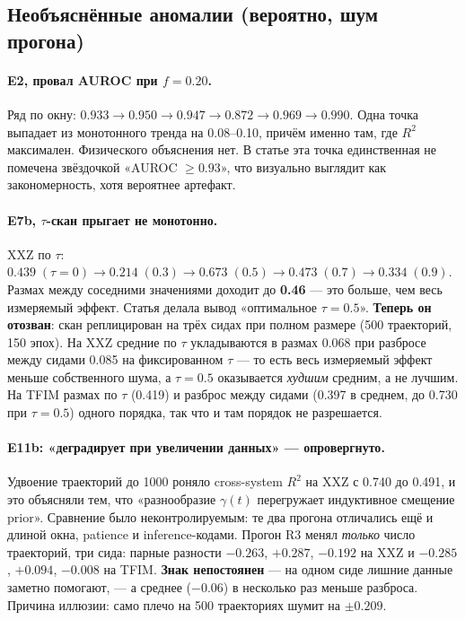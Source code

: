 \documentclass[12pt,a4paper]{article}
\begin{document}
\subsection{Необъяснённые аномалии (вероятно, шум прогона)}

\paragraph{E2, провал AUROC при $f=0.20$.} Ряд по окну: $0.933\to 0.950\to
0.947\to \mathbf{0.872}\to 0.969\to 0.990$. Одна точка выпадает из монотонного
тренда на 0.08–0.10, причём именно там, где $R^2$ максимален. Физического
объяснения нет. В статье эта точка единственная не помечена звёздочкой
«AUROC $\geq 0.93$», что визуально выглядит как закономерность, хотя вероятнее
артефакт.

\paragraph{E7b, $\tau$-скан прыгает не монотонно.} XXZ по $\tau$: $0.439\;
(\tau{=}0)\to \mathbf{0.214}\;(0.3)\to \mathbf{0.673}\;(0.5)\to 0.473\;(0.7)\to
0.334\;(0.9)$. Размах между соседними значениями доходит до \textbf{0.46} — это
больше, чем весь измеряемый эффект. Статья делала вывод «оптимальное
$\tau=0.5$». \textbf{Теперь он отозван}: скан реплицирован на трёх сидах при
полном размере (500 траекторий, 150 эпох). На XXZ средние по $\tau$
укладываются в размах 0.068 при разбросе между сидами 0.085 на фиксированном
$\tau$ — то есть весь измеряемый эффект меньше собственного шума, а
$\tau=0.5$ оказывается \emph{худшим} средним, а не лучшим. На TFIM размах по
$\tau$ (0.419) и разброс между сидами (0.397 в среднем, до 0.730 при
$\tau=0.5$) одного порядка, так что и там порядок не разрешается.

\paragraph{E11b: «деградирует при увеличении данных» — \textbf{опровергнуто}.}
Удвоение траекторий до 1000 роняло cross-system $R^2$ на XXZ с 0.740 до 0.491,
и это объясняли тем, что «разнообразие $\gamma(t)$ перегружает индуктивное
смещение prior». Сравнение было неконтролируемым: те два прогона отличались ещё
и длиной окна, patience и inference-кодами. Прогон R3 менял \emph{только} число
траекторий, три сида: парные разности $-0.263$, $+0.287$, $-0.192$ на XXZ и
$-0.285$, $+0.094$, $-0.008$ на TFIM. \textbf{Знак непостоянен} — на одном сиде
лишние данные заметно помогают, — а среднее ($-0.06$) в несколько раз меньше
разброса. Причина иллюзии: само плечо на 500 траекториях шумит на $\pm0.209$.
\end{document}
